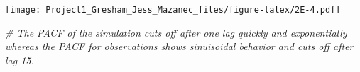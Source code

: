 \documentclass[
]{article}
\newenvironment{Shaded}{\begin{snugshade}}{\end{snugshade}}
\newcommand{\CommentTok}[1]{\textcolor[rgb]{0.56,0.35,0.01}{\textit{#1}}}
\begin{document}
\texttt{[image: Project1\_Gresham\_Jess\_Mazanec\_files/figure-latex/2E-4.pdf]}

\begin{Shaded}
\begin{Highlighting}[]
\CommentTok{# The PACF of the simulation cuts off after one lag quickly and exponentially whereas the PACF for observations shows sinuisoidal behavior and cuts off after lag 15.}
\end{Highlighting}
\end{Shaded}
\end{document}
